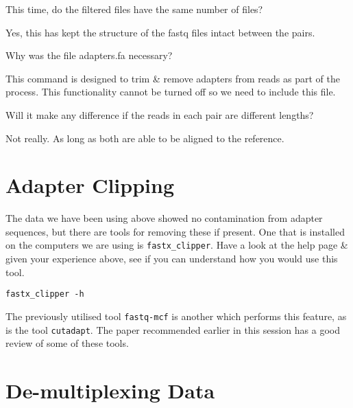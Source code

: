 \begin{questions}
This time, do the filtered files have the same number of files? \\
\begin{answer}
Yes, this has kept the structure of the fastq files intact between the pairs. \\
\end{answer}
Why was the file adapters.fa necessary? \\
\begin{answer}
This command is designed to trim \& remove adapters from reads as part of the process.
This functionality cannot be turned off so we need to include this file.\\
\end{answer}
Will it make any difference if the reads in each pair are different lengths?\\
\begin{answer}
Not really. As long as both are able to be aligned to the reference.
\end{answer}
\end{questions}


\section{Adapter Clipping}
\begin{advanced}
The data we have been using above showed no contamination from adapter sequences, but there are tools for removing these if present.
One that is installed on the computers we are using is \texttt{fastx_clipper}.
Have a look at the help page \& given your experience above, see if you can understand how you would use this tool. \\
\begin{lstlisting}
fastx_clipper -h
\end{lstlisting}
The previously utilised tool \texttt{fastq-mcf} is another which performs this feature, as is the tool \texttt{cutadapt}.
The paper recommended earlier in this session has a good review of some of these tools.
\end{advanced}


\section{De-multiplexing Data}

